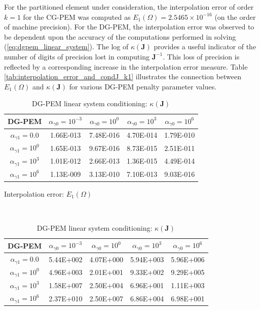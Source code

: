 For the partitioned element under consideration, the interpolation error of order $k=1$ for the CG-PEM was computed as $E_1 (\Omega) = 2.5465 \times 10^{-16}$ (on the order of machine precision). For the DG-PEM, the interpolation error was observed to be dependent upon the accuracy of the computations performed in solving (\ref{eq:dgpem_linear_system}). The log of $\kappa(\mathbf{J})$ provides a useful indicator of the number of digits of precision lost in computing $\mathbf{J}^{-1}$. This loss of precision is reflected by a corresponding increase in the interpolation error measure. Table \ref{tab:interpolation_error_and_condJ_k1} illustrates the connection between $E_1 (\Omega)$ and $\kappa(\mathbf{J})$ for various DG-PEM penalty parameter values. 

\begin{table}
\centering
\begin{subtable}{1.0\textwidth}
\centering
\begin{tabular}{| c || c | c | c | c |}
    \hline
DG-PEM & $\alpha_{\gamma0} = 10^{-3}$ & $\alpha_{\gamma0} = 10^{0}$ & $\alpha_{\gamma0} = 10^{3}$ & $\alpha_{\gamma0} = 10^{6}$ \\ \hline \hline
$\alpha_{\gamma1} = 0.0$	& 1.66E-013 & 7.48E-016 & 4.70E-014 & 1.79E-010 \\ \hline
$\alpha_{\gamma1} = 10^{0}$ & 1.65E-013 & 9.67E-016 & 8.73E-015 & 2.51E-011 \\ \hline
$\alpha_{\gamma1} = 10^{3}$ & 1.01E-012 & 2.66E-013 & 1.36E-015 & 4.49E-014 \\ \hline
$\alpha_{\gamma1} = 10^{6}$ & 1.13E-009 & 3.13E-010 & 7.10E-013 & 9.03E-016 \\
    \hline
    \end{tabular}
    \caption{Interpolation error: $E_1 (\Omega)$}
    \label{tab:interpolation_error_k1}
\end{subtable}%
\\
\begin{subtable}{1.0\textwidth}
\centering
\begin{tabular}{| c || c | c | c | c |}
    \hline
DG-PEM & $\alpha_{\gamma0} = 10^{-3}$	&	$\alpha_{\gamma0} = 10^{0}$	&	$\alpha_{\gamma0} = 10^{3}$	&	$\alpha_{\gamma0} = 10^{6}$ \\ \hline \hline
$\alpha_{\gamma1} = 0.0$	&	5.44E+002 & 4.07E+000 & 5.94E+003 & 5.96E+006 \\ \hline
$\alpha_{\gamma1} = 10^{0}$	&	4.96E+003 & 2.01E+001 & 9.33E+002 & 9.29E+005 \\ \hline
$\alpha_{\gamma1} = 10^{3}$	&	1.58E+007 & 2.50E+004 & 6.96E+001 & 1.11E+003 \\ \hline
$\alpha_{\gamma1} = 10^{6}$	&	2.37E+010 & 2.50E+007 & 6.86E+004 & 6.98E+001 \\
    \hline
    \end{tabular}
    \caption{DG-PEM linear system conditioning: $\kappa(\mathbf{J})$}
    \label{tab:condJ_k1}
\end{subtable}


\end{table}
